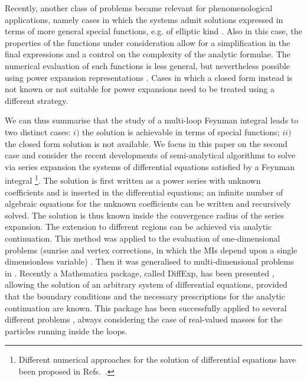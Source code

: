 \documentclass[final,1p,times]{elsarticle}
\begin{document}
Recently, another class of problems became relevant for phenomenological applications, namely cases in which the systems admit solutions expressed in terms of more general special functions, e.g. of elliptic kind \cite{Adams:2016xah,Remiddi:2017har,Broedel:2017kkb,Broedel:2017siw,Broedel:2018iwv,Ablinger:2017bjx,Bourjaily:2022bwx}. Also in this case, the properties of the functions under consideration allow for a simplification in the final expressions and a control on the complexity of the analytic formulae. The numerical evaluation of such functions is less general, but nevertheless possible using power expansion representations \cite{Walden:2020odh}. 
%
Cases in which a closed form instead is not known or not suitable for power expansions need to be treated using a different strategy.

We can thus summarise that the study of a multi-loop 
Feynman integral leads to two distinct cases: $i)$ the solution is achievable in terms of special functions; $ii)$ the closed form solution is not available.
We focus in this paper on the second case and consider the recent developments of semi-analytical algorithms to solve via series expansion the systems of differential equations satisfied by a Feynman integral
\footnote{
Different numerical approaches for the solution of differential equations have been proposed in Refs.~\cite{Czakon:2008zk,Mandal:2018cdj}.
}.
The solution is first written as a power series with unknown coefficients and is inserted in the differential equations; an infinite number of algebraic equations for the unknown coefficients can be written and recursively solved. The solution is thus known inside the convergence radius of the series expansion. The extension to different regions can be achieved via analytic continuation.
 This method was applied to the evaluation of one-dimensional problems (sunrise and vertex corrections, in which the MIs depend upon a single dimensionless variable) \cite{Pozzorini:2005ff,Aglietti:2007as,Lee:2017qql,Lee:2018ojn,Bonciani:2018uvv,Fael:2021kyg,Fael:2022rgm}. Then it was generalised to multi-dimensional problems in \cite{Moriello:2019yhu}. Recently a {\sc Mathematica} package, called {\sc DiffExp}, has been presented \cite{Hidding:2020ytt}, allowing the solution of an arbitrary system of differential equations, provided that the boundary conditions and the necessary prescriptions for the analytic continuation are known. This package has been successfully applied to several different problems \cite{Bonciani:2019jyb,Frellesvig:2019byn,Abreu:2020jxa,Dubovyk:2022frj,Bonciani:2021zzf,Becchetti:2020wof,Becchetti:2021axs}, always considering the case of real-valued masses for the particles running inside the loops.
 
\end{document}

